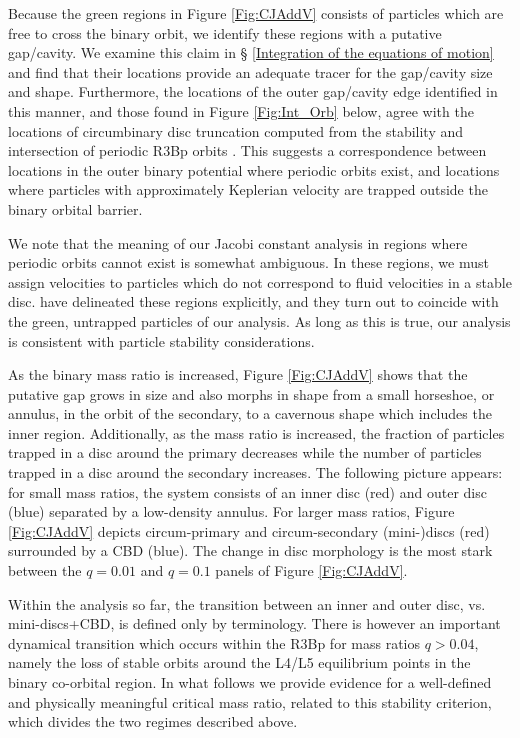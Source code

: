 Because the green regions in Figure \ref{Fig:CJAddV} consists of
particles which are free to cross the binary orbit, we identify these
regions with a putative gap/cavity. We examine this claim in \S
\ref{Integration of the equations of motion} and find that their
locations provide an adequate tracer for the gap/cavity size and shape. 
Furthermore, the locations of the outer gap/cavity edge identified in this manner, and those 
found in Figure \ref{Fig:Int_Orb} below, agree with the 
locations of circumbinary disc truncation computed from the stability 
and intersection of periodic R3Bp orbits \citep{RP:Excretion:1981}. This suggests a correspondence between locations in the outer binary potential where periodic orbits exist, and locations where particles with approximately Keplerian velocity are trapped outside the binary orbital barrier.



We note that the meaning of our Jacobi constant analysis in regions where periodic orbits cannot exist is somewhat ambiguous. In these regions, we must assign velocities to particles which do not correspond to fluid velocities in a stable disc.  \cite{RP:Excretion:1981} have delineated these regions explicitly, and they turn out to coincide with the green, untrapped particles of our analysis. As long as this is true, our analysis is consistent with particle stability considerations.




As the binary mass ratio is increased, Figure
\ref{Fig:CJAddV} shows that the putative gap grows in size and also
morphs in shape from a small horseshoe, or annulus, in the orbit of
the secondary, to a cavernous shape which includes the inner
region. Additionally, as the mass ratio is increased, the fraction of
particles trapped in a disc around the primary decreases while the
number of particles trapped in a disc around the secondary
increases. The following picture appears: for small mass ratios, the
system consists of an inner disc (red) and outer disc (blue) separated
by a low-density annulus. For larger mass ratios, Figure
\ref{Fig:CJAddV} depicts circum-primary and circum-secondary
(mini-)discs (red) surrounded by a CBD (blue). The change in
disc morphology is the most stark between the $q=0.01$ and $q=0.1$
panels of Figure \ref{Fig:CJAddV}.

Within the analysis so far, the transition between an inner and outer
disc, vs. mini-discs+CBD, is defined only by terminology. There is
however an important dynamical transition which occurs within the R3Bp
for mass ratios $q> 0.04$, namely the loss of stable orbits around the
L4/L5 equilibrium points in the binary co-orbital region. In what
follows we provide evidence for a well-defined and physically
meaningful critical mass ratio, related to this stability criterion,
which divides the two regimes described above.





